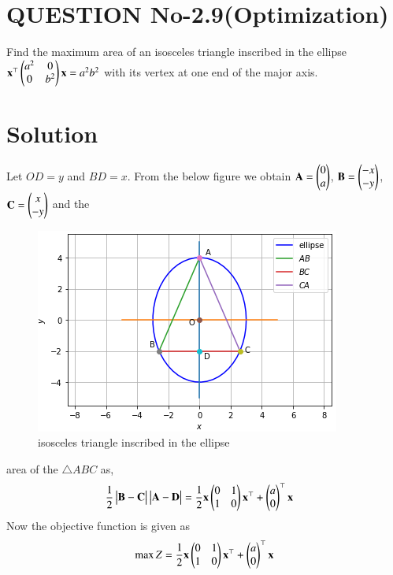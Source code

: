 \documentclass[journal,12pt,twocolumn]{IEEEtran}
\begin{document}
%
\section{QUESTION No-2.9(Optimization)}
Find the maximum area of an isosceles triangle inscribed in the ellipse $\mathbf{x}^{\top}\begin{pmatrix}a^2 & 0 \\ 0 & b^2\end{pmatrix}\mathbf{x} = a^2b^2$
with its vertex at one end of the major axis.
\section{Solution}
Let $OD=y$ and $BD=x$. From the below figure we obtain $\mathbf{A} = \begin{pmatrix}0 \\ a\end{pmatrix}$, $\mathbf{B} = \begin{pmatrix}-x \\ -y\end{pmatrix}$, $\mathbf{C} = \begin{pmatrix}x \\ -y\end{pmatrix}$ and the 
\begin{figure}[!ht]
\centering
\includegraphics[width=\columnwidth]{isosceles.PNG}
\caption{isosceles triangle inscribed in the ellipse}
\label{fig:Graph}	
\end{figure}
area of the $\triangle ABC$ as, 
\begin{align}
    \frac{1}{2}\begin{vmatrix}\mathbf{B}-\mathbf{C}\end{vmatrix}\begin{vmatrix}\mathbf{A}-\mathbf{D}\end{vmatrix} &=\frac{1}{2}\mathbf{x}\begin{pmatrix}0&1 \\ 1&0\end{pmatrix}\mathbf{x}^{\top}+ \begin{pmatrix}a \\ 0\end{pmatrix}^{\top}\mathbf{x}
\end{align}
Now the objective function is given as
\begin{align}
    \max Z = \frac{1}{2}\mathbf{x}\begin{pmatrix}0&1 \\ 1&0\end{pmatrix}\mathbf{x}^{\top}+ \begin{pmatrix}a \\ 0\end{pmatrix}^{\top}\mathbf{x}
\end{align}
\end{document}
